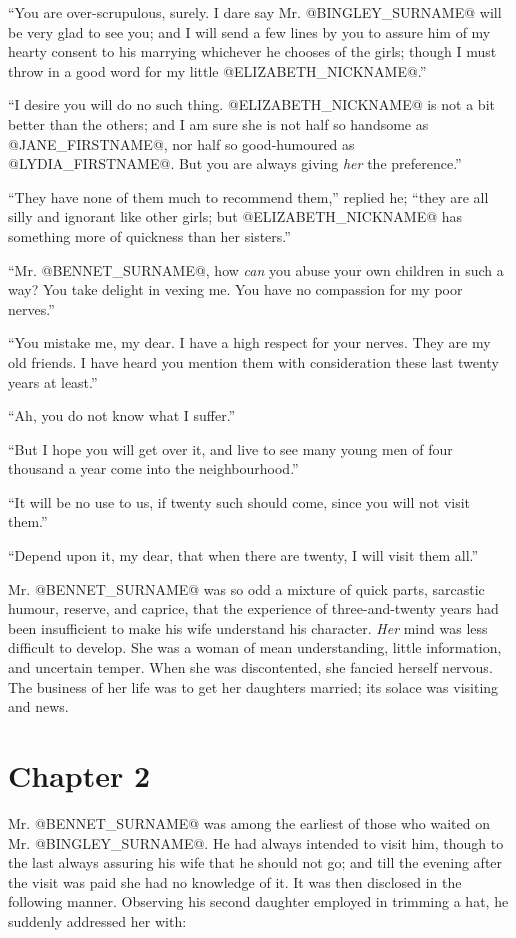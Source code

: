 ``You are over-scrupulous, surely. I dare say Mr. @BINGLEY_SURNAME@ will be very
glad to see you; and I will send a few lines by you to assure him of my
hearty consent to his marrying whichever he chooses of the girls; though
I must throw in a good word for my little @ELIZABETH_NICKNAME@.''

``I desire you will do no such thing. @ELIZABETH_NICKNAME@ is not a bit better than the
others; and I am sure she is not half so handsome as @JANE_FIRSTNAME@, nor half so
good-humoured as @LYDIA_FIRSTNAME@. But you are always giving \textit{her} the preference.''

``They have none of them much to recommend them,'' replied he; ``they are
all silly and ignorant like other girls; but @ELIZABETH_NICKNAME@ has something more of
quickness than her sisters.''

``Mr. @BENNET_SURNAME@, how \textit{can} you abuse your own children in such a way? You
take delight in vexing me. You have no compassion for my poor nerves.''

``You mistake me, my dear. I have a high respect for your nerves. They
are my old friends. I have heard you mention them with consideration
these last twenty years at least.''

``Ah, you do not know what I suffer.''

``But I hope you will get over it, and live to see many young men of four
thousand a year come into the neighbourhood.''

``It will be no use to us, if twenty such should come, since you will not
visit them.''

``Depend upon it, my dear, that when there are twenty, I will visit them
all.''

Mr. @BENNET_SURNAME@ was so odd a mixture of quick parts, sarcastic humour,
reserve, and caprice, that the experience of three-and-twenty years had
been insufficient to make his wife understand his character. \textit{Her} mind
was less difficult to develop. She was a woman of mean understanding,
little information, and uncertain temper. When she was discontented,
she fancied herself nervous. The business of her life was to get her
daughters married; its solace was visiting and news.



\chapter*{Chapter 2}


Mr. @BENNET_SURNAME@ was among the earliest of those who waited on Mr. @BINGLEY_SURNAME@. He
had always intended to visit him, though to the last always assuring
his wife that he should not go; and till the evening after the visit was
paid she had no knowledge of it. It was then disclosed in the following
manner. Observing his second daughter employed in trimming a hat, he
suddenly addressed her with:

